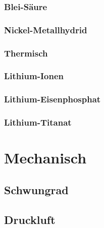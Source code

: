 \documentclass{scrreprt}
\begin{document}
\subsubsection{Blei-Säure}
\subsubsection{Nickel-Metallhydrid}
\subsubsection{Thermisch} %
\subsubsection{Lithium-Ionen}
\subsubsection{Lithium-Eisenphosphat}
\subsubsection{Lithium-Titanat}

\section{Mechanisch}
\subsection{Schwungrad}
\subsection{Druckluft}
\end{document}
